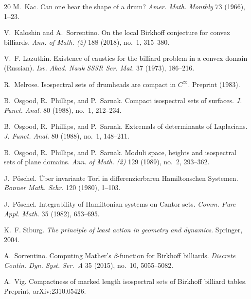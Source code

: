 \documentclass[a4paper]{article}
\theoremstyle{definition}
\begin{document}
\begin{thebibliography}{20}
M.~Kac.
\newblock Can one hear the shape of a drum?
\newblock \emph{Amer. Math. Monthly} 73 (1966), 1--23.

V.~Kaloshin and A.~Sorrentino.
\newblock On the local Birkhoff conjecture for convex billiards.
\newblock \emph{Ann. of Math. (2)} 188 (2018), no.~1, 315--380.

V.~F. Lazutkin.
\newblock Existence of caustics for the billiard problem in a convex domain (Russian).
\newblock \emph{Izv. Akad. Nauk SSSR Ser. Mat.} 37 (1973), 186--216.

R.~Melrose.
\newblock Isospectral sets of drumheads are compact in $C^\infty$.
\newblock Preprint (1983).

B.~Osgood, R.~Phillips, and P.~Sarnak.
\newblock Compact isospectral sets of surfaces.
\newblock \emph{J. Funct. Anal.} 80 (1988), no.~1, 212--234.

B.~Osgood, R.~Phillips, and P.~Sarnak.
\newblock Extremals of determinants of Laplacians.
\newblock \emph{J. Funct. Anal.} 80 (1988), no.~1, 148--211.

B.~Osgood, R.~Phillips, and P.~Sarnak.
\newblock Moduli space, heights and isospectral sets of plane domains.
\newblock \emph{Ann. of Math. (2)} 129 (1989), no.~2, 293--362.

J.~P\"oschel.
\newblock \"Uber invariante Tori in differenzierbaren Hamiltonschen Systemen.
\newblock \emph{Bonner Math. Schr.} 120 (1980), 1--103.

J.~P\"oschel.
\newblock Integrability of Hamiltonian systems on Cantor sets.
\newblock \emph{Comm. Pure Appl. Math.} 35 (1982), 653--695.

K.~F. Siburg.
\newblock \emph{The principle of least action in geometry and dynamics}.
\newblock Springer, 2004.

A.~Sorrentino.
\newblock Computing Mather's $\beta$-function for Birkhoff billiards.
\newblock \emph{Discrete Contin. Dyn. Syst. Ser.~A} 35 (2015), no.~10, 5055--5082.

A.~Vig.
\newblock Compactness of marked length isospectral sets of Birkhoff billiard tables.
\newblock Preprint, arXiv:2310.05426.

\end{thebibliography}
\end{document}

